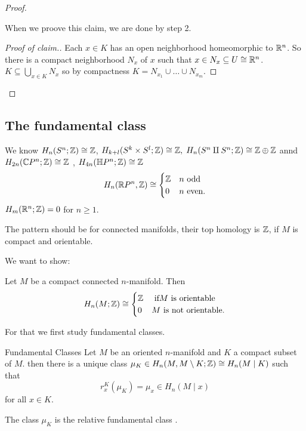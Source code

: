 \documentclass[language=english]{TemplateLecture}
\begin{document}
\begin{proof}
\begin{description}
    When we proove this claim, we are done by step 2.

    \begin{proof}[Proof of claim.]
        Each \(x \in K\) has an open neighborhood homeomorphic to \(\mathbb{R}^n\). So there is a compact neighborhood \(N_x\) of \(x\) such that \(x \in N_x \subseteq U \cong \mathbb{R}^n\). \(K \subseteq \bigcup_{x \in K} N_x\) so by compactness \(K = N_{x_1} \cup \dots \cup N_{x_m}\).
    \end{proof}
    \end{description}
\end{proof}

\subsection{The fundamental class}

We know \(H_n(S^n; \mathbb{Z}) \cong \mathbb{Z}\), \(H_{k+l}(S^k \times S^l; \mathbb{Z}) \cong \mathbb{Z}, \; H_n(S^n \amalg S^n; \mathbb{Z}) \cong \mathbb{Z} \oplus \mathbb{Z}\) annd \(H_{2n}(\mathbb{C} P^n; \mathbb{Z}) \cong \mathbb{Z}\)
, \(H_{4n}(\mathbb{H} P^n; \mathbb{Z}) \cong \mathbb{Z}\)
\[H_n(\mathbb{R} P^n, \mathbb{Z}) \cong \begin{cases}
    \mathbb{Z} & n \text{ odd} \\
    0 & n \text{ even.}
\end{cases}\]
\(H_m(\mathbb{R}^n; \mathbb{Z}) = 0\) for \(n \geq 1\).

The pattern should be for connected manifolds, their top homology is \(\mathbb{Z}\), if \(M\) is compact and orientable.

We want to show:
\begin{proposition}
    Let \(M\) be a compact connected \(n\)-manifold. Then
    \[H_n(M; \mathbb{Z}) \cong \begin{cases}
        \mathbb{Z} & \text{ if} M \text{ is orientable} \\
        0 & M \text{ is not orientable.}
    \end{cases}\]
\end{proposition}

For that we first study fundamental classes.
\begin{thm}{Fundamental Classes}{}
    Let \(M\) be an oriented \(n\)-manifold and \(K\) a compact subset of \(M\). then there is a unique class \(\mu_K\in H_n(M, M \setminus K; \mathbb{Z}) \cong H_n(M \mid K)\) such that
    \[r_x^K(\mu_K) = \mu_x \in H_n(M \mid x)\]
    for all \(x \in K\).

    The class \(\mu_K\) is the relative fundamental class .
\end{thm}
\end{document}
